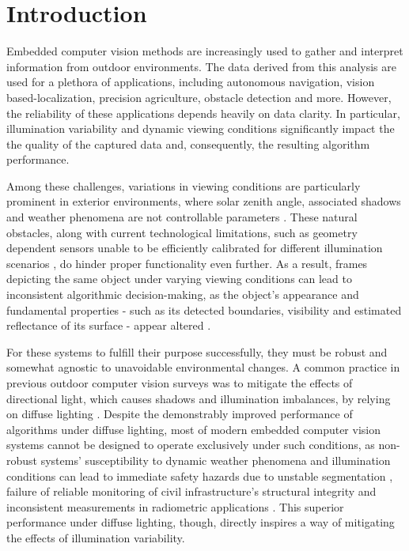 \chapter{Introduction}
\label{chap1}

Embedded computer vision methods are increasingly used to gather and interpret information from outdoor environments. The data derived from this analysis are used for a plethora of applications, including autonomous navigation, vision based-localization, precision agriculture, obstacle detection and more. However, the reliability of these applications depends heavily on data clarity. In particular, illumination variability and dynamic viewing conditions significantly impact the the quality of the captured data and, consequently, the resulting algorithm performance. 

Among these challenges, variations in viewing conditions are particularly prominent in exterior environments, where solar zenith angle, associated shadows and weather phenomena are not controllable parameters \cite{edges_under_illumvar, dl_low_light, impact_of_sunlight_conditions, fruit_detection_illvar, effect-time-day}. These natural obstacles, along with current technological limitations, such as  geometry dependent sensors unable to be efficiently calibrated for different illumination scenarios \cite{color_consistency}, do hinder proper functionality even further. As a result, frames depicting the same object under varying viewing conditions can lead to inconsistent algorithmic decision-making, as the object's appearance and fundamental properties - such as its detected boundaries, visibility and estimated reflectance of its surface -  appear altered \cite{edges_under_illumvar, dl_low_light, impact_of_sunlight_conditions}.

For these systems to fulfill their purpose successfully, they must be robust and somewhat agnostic to unavoidable environmental changes. A common practice in previous outdoor computer vision surveys was to mitigate the effects of directional light, which causes shadows and illumination imbalances, by relying on diffuse lighting \cite{impact_of_sunlight_conditions, ps_cloudy, autonomous_agriculture}. Despite the demonstrably improved performance of algorithms under diffuse lighting, most of modern embedded computer vision systems cannot be designed to operate exclusively under such conditions, as non-robust systems' susceptibility to dynamic weather phenomena and illumination conditions can lead to immediate safety hazards due to unstable segmentation \cite{safetyhaz-cv}, failure of reliable monitoring of civil infrastructure's structural integrity \cite{bridges, construction-site} and inconsistent measurements in radiometric applications \cite{impact_of_sunlight_conditions, effect-time-day, variable-illum-vi}. This superior performance under diffuse lighting, though, directly inspires a way of mitigating the effects of illumination variability.

